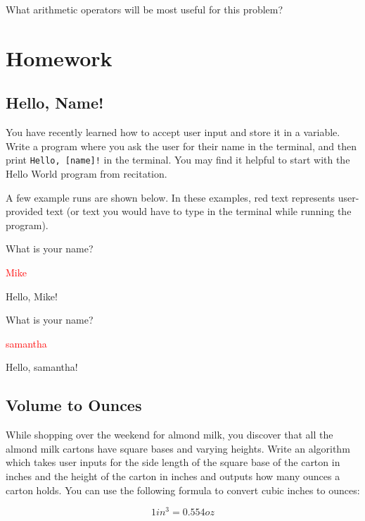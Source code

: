 \vspace{3cm}

\begin{multipart}
    What arithmetic operators will be most useful for this problem?
\end{multipart}

\vspace{2cm}

\section{Homework}
\subsection{Hello, Name!}
You have recently learned how to accept user input and store it in a variable. Write a program where you ask the user for their name in the terminal, and then print \texttt{Hello, [name]!} in the terminal. You may find it helpful to start with the Hello World program from recitation. 

A few example runs are shown below. In these examples, red text represents user-provided text (or text you would have to type in the terminal while running the program). 

\begin{sample}
What is your name?

\textcolor{red}{Mike}

Hello, Mike!
\end{sample}

\begin{sample}
What is your name?

\textcolor{red}{samantha}

Hello, samantha!
\end{sample}

\subsection{Volume to Ounces}

While shopping over the weekend for almond milk, you discover that all the almond milk cartons have square bases and varying heights. Write an algorithm which takes user inputs for the side length of the square base of the carton in inches and the height of the carton in inches and outputs how many ounces a carton holds. You can use the following formula to convert cubic inches to ounces:

$$1 in^3 = 0.554 oz$$

